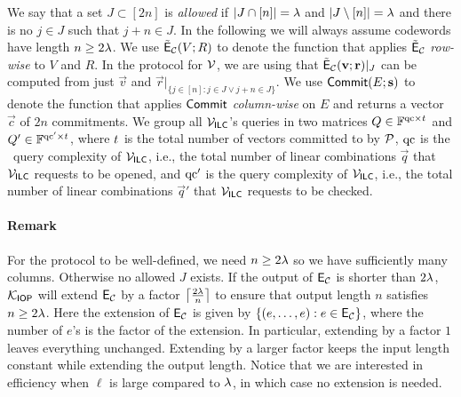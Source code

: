 We say that a set $J\subset [2n]$ is \emph{allowed} if $|J\cap [n]|=\lambda$ and $|J\setminus [n]|=\lambda$ and there is no $j\in J$ such that $j+n\in J$. In the following we will always assume codewords have length $n\geq 2\lambda$.
We use $\tilde{\mathsf{E}}_{\mathcal{C}}(V;R)$ to denote the function that applies $\tilde{\mathsf{E}}_{\mathcal{C}}$ \emph{row-wise} to $V$ and $R$.
In the protocol for $\mathcal{V}$, we are using that $\tilde{\mathsf{E}}_{\mathcal{C}}(\mathbf{v};\mathbf{r})|_J$ can be computed from just $\vec{v}$ and $\vec{r}|_{\{j\in [n]:j\in J \vee j+n\in J\}}$. We use $\mathsf{Commit}(E;\mathbf{s})$ to denote the function that applies $\mathsf{Commit}$ \emph{column-wise} on $E$ and returns a vector $\vec{c}$ of $2n$ commitments. 
We group all $\mathcal{V}_{\mathsf{ILC}}$'s queries in two matrices $Q \in \mathbb{F}^{\mathrm{qc}\times {t_{}}}$ and $Q' \in \mathbb{F}^{\mathrm{qc}' \times {t_{}}}$, where ${t_{}}$ is the total number of vectors committed to by $\mathcal{P}$, $\mathrm{qc}$ is the \ILCopen\ query complexity of $\mathcal{V}_{\mathsf{ILC}}$, i.e., the total number of linear combinations $\vec{q}$ that $\mathcal{V}_{\mathsf{ILC}}$ requests to be opened, and $\mathrm{qc}'$ is the \ILCcheck query complexity of $\mathcal{V}_{\mathsf{ILC}}$, i.e., the total number of linear combinations $\vec{q}'$ that $\mathcal{V}_{\mathsf{ILC}}$ requests to be checked.

\paragraph{Remark}\label{welldef} For the protocol to be well-defined, we need $n\geq 2\lambda$ so we have sufficiently many columns. Otherwise no allowed $J$ exists. If the output of $\mathsf{E}_{\mathcal{C}}$ is shorter than $2\lambda$, $\mathcal{K}_{\mathsf{IOP}}$ will extend $\mathsf{E}_{\mathcal{C}}$ by a factor $\left\lceil \frac{2\lambda}{n}\right\rceil$ to ensure that output length $n$ satisfies $n\geq 2\lambda$. Here the extension of $\mathsf{E}_{\mathcal{C}}$ is given by $\{(e,\dots,e): e\in\mathsf{E}_{\mathcal{C}}\}$, where the number of $e$'s is the factor of the extension. In particular, extending by a factor $1$ leaves everything unchanged. Extending by a larger factor keeps the input length constant while extending the output length. Notice that we are interested in efficiency when $\ell$ is large compared to $\lambda$, in which case no extension is needed.

